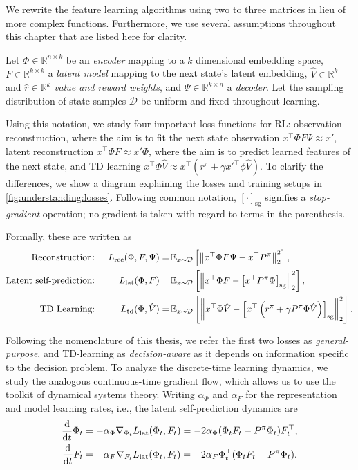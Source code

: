 We rewrite the feature learning algorithms using two to three matrices in lieu of more complex functions. Furthermore, we use several assumptions throughout this chapter that are listed here for clarity.

\begin{assumption}
\label{assumption:understanding:1}
Let $\Phi \in \mathbb{R}^{n \times k}$ be an \emph{encoder} mapping to a $k$ dimensional embedding space,
$F \in \mathbb{R}^{k\times k}$ a \emph{latent model} mapping to the next state's latent embedding, $\hat{V} \in \mathbb{R}^{k}$ and $\hat{r} \in \mathbb{R}^{k}$ \emph{value and reward weights}, and $\Psi \in \mathbb{R}^{k \times n}$ a \emph{decoder}.
Let the sampling distribution of state samples $\mathcal{D}$ be uniform and fixed throughout learning.
\end{assumption}

Using this notation, we study four important loss functions for RL: observation reconstruction, where the aim is to fit the next state observation $x^\top \Phi F \Psi \approx x'$, latent reconstruction $x^\top \Phi F \approx x' \Phi$, where the aim is to predict learned features of the next state, and TD learning $x^\top \Phi \hat{V} \approx x^\top(r^\pi + \gamma x'^\top\phi \hat{V})$. To clarify the differences, we show a diagram explaining the losses and training setups in \autoref{fig:understanding:losses}.
Following common notation, $[\cdot]_\mathrm{sg}$ signifies a \emph{stop-gradient} operation; no gradient is taken with regard to terms in the parenthesis.

Formally, these are written as
\begin{align}
    \text{Reconstruction: }&& L_{\text{rec}}(\Phi,F,\Psi) =& \,\mathbb{E}_{x \sim \mathcal{D}}\left[  \left\lVert x^\top \Phi F \Psi - x^\top {P^\pi} \right\rVert_2^2 \right],\\
    \text{Latent self-prediction: }&& L_{\text{lat}}(\Phi,F) =& \,\mathbb{E}_{x \sim \mathcal{D}}\left[  \left\lVert x^\top \Phi F - \left[x^\top {P^\pi} \Phi\right]_{\mathrm{sg}} \right\rVert_2^2 \right], \\
    \text{TD Learning: }&& L_{\text{td}}(\Phi,\hat{V}) =& \,\mathbb{E}_{x \sim \mathcal{D}}\left[  \left\lVert x^\top \Phi \hat{V} - \left[x^\top  \left(r^\pi + \gamma P^\pi \Phi \hat{V}\right)\right]_{\mathrm{sg}} \right\rVert_2^2 \right].
\end{align}

Following the nomenclature of this thesis, we refer the first two losses as \emph{general-purpose}, and TD-learning as \emph{decision-aware} as it depends on information specific to the decision problem.
To analyze the discrete-time learning dynamics, we study the analogous continuous-time gradient flow, which allows us to use the toolkit of dynamical systems theory.
Writing $\alpha_\Phi$ and $\alpha_F$ for the representation and model learning rates, i.e., the latent self-prediction dynamics are
\begin{align}
    \frac{\mathrm{d}}{\mathrm{d} t} \Phi_t &= -\alpha_\Phi\nabla_{\Phi_t} {L}_{\text{lat}}(\Phi_t, F_t) = -2 \alpha_\Phi (\Phi_t F_t - P^\pi \Phi_t)  F_t^\top,\\
    \frac{\mathrm{d}}{\mathrm{d} t} F_t  &= -\alpha_F\nabla_{F_t} {L}_{\text{lat}}(\Phi_t, F_t) = -2 \alpha_F \Phi_t^\top(\Phi_t F_t - P^\pi \Phi_t).
\end{align}

